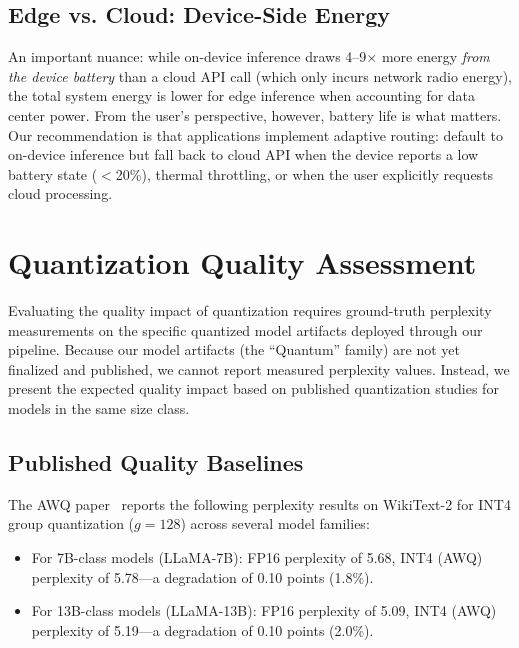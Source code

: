 \documentclass[12pt, letterpaper, twoside]{report}
\begin{document}
\subsection{Edge vs. Cloud: Device-Side Energy}
\label{subsec:edge_cloud_energy}

An important nuance: while on-device inference draws 4--9$\times$ more energy \textit{from the device battery} than a cloud API call (which only incurs network radio energy), the total system energy is lower for edge inference when accounting for data center power. From the user's perspective, however, battery life is what matters. Our recommendation is that applications implement adaptive routing: default to on-device inference but fall back to cloud API when the device reports a low battery state ($<$20\%), thermal throttling, or when the user explicitly requests cloud processing.

\section{Quantization Quality Assessment}
\label{sec:quality_assessment}

Evaluating the quality impact of quantization requires ground-truth perplexity measurements on the specific quantized model artifacts deployed through our pipeline. Because our model artifacts (the ``Quantum'' family) are not yet finalized and published, we cannot report measured perplexity values. Instead, we present the expected quality impact based on published quantization studies for models in the same size class.

\subsection{Published Quality Baselines}
\label{subsec:published_quality}

The AWQ paper~\citep{lin2024awq} reports the following perplexity results on WikiText-2 for INT4 group quantization ($g = 128$) across several model families:

\begin{itemize}[itemsep=1pt, topsep=2pt, parsep=0pt]
\item For 7B-class models (LLaMA-7B): FP16 perplexity of 5.68, INT4 (AWQ) perplexity of 5.78---a degradation of 0.10 points (1.8\%).
\item For 13B-class models (LLaMA-13B): FP16 perplexity of 5.09, INT4 (AWQ) perplexity of 5.19---a degradation of 0.10 points (2.0\%).
\end{itemize}
\end{document}
